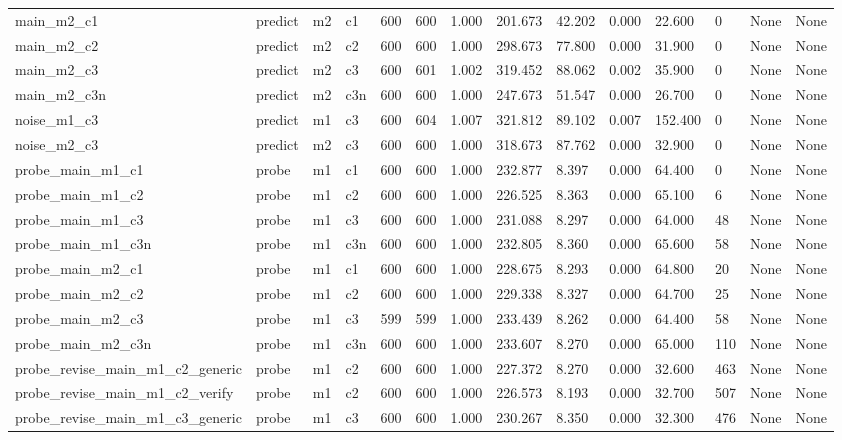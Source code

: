 \begin{tabular}{llllllllllllll}
main\_m2\_c1 & predict & m2 & c1 & 600 & 600 & 1.000 & 201.673 & 42.202 & 0.000 & 22.600 & 0 & None & None \\
main\_m2\_c2 & predict & m2 & c2 & 600 & 600 & 1.000 & 298.673 & 77.800 & 0.000 & 31.900 & 0 & None & None \\
main\_m2\_c3 & predict & m2 & c3 & 600 & 601 & 1.002 & 319.452 & 88.062 & 0.002 & 35.900 & 0 & None & None \\
main\_m2\_c3n & predict & m2 & c3n & 600 & 600 & 1.000 & 247.673 & 51.547 & 0.000 & 26.700 & 0 & None & None \\
noise\_m1\_c3 & predict & m1 & c3 & 600 & 604 & 1.007 & 321.812 & 89.102 & 0.007 & 152.400 & 0 & None & None \\
noise\_m2\_c3 & predict & m2 & c3 & 600 & 600 & 1.000 & 318.673 & 87.762 & 0.000 & 32.900 & 0 & None & None \\
probe\_main\_m1\_c1 & probe & m1 & c1 & 600 & 600 & 1.000 & 232.877 & 8.397 & 0.000 & 64.400 & 0 & None & None \\
probe\_main\_m1\_c2 & probe & m1 & c2 & 600 & 600 & 1.000 & 226.525 & 8.363 & 0.000 & 65.100 & 6 & None & None \\
probe\_main\_m1\_c3 & probe & m1 & c3 & 600 & 600 & 1.000 & 231.088 & 8.297 & 0.000 & 64.000 & 48 & None & None \\
probe\_main\_m1\_c3n & probe & m1 & c3n & 600 & 600 & 1.000 & 232.805 & 8.360 & 0.000 & 65.600 & 58 & None & None \\
probe\_main\_m2\_c1 & probe & m1 & c1 & 600 & 600 & 1.000 & 228.675 & 8.293 & 0.000 & 64.800 & 20 & None & None \\
probe\_main\_m2\_c2 & probe & m1 & c2 & 600 & 600 & 1.000 & 229.338 & 8.327 & 0.000 & 64.700 & 25 & None & None \\
probe\_main\_m2\_c3 & probe & m1 & c3 & 599 & 599 & 1.000 & 233.439 & 8.262 & 0.000 & 64.400 & 58 & None & None \\
probe\_main\_m2\_c3n & probe & m1 & c3n & 600 & 600 & 1.000 & 233.607 & 8.270 & 0.000 & 65.000 & 110 & None & None \\
probe\_revise\_main\_m1\_c2\_generic & probe & m1 & c2 & 600 & 600 & 1.000 & 227.372 & 8.270 & 0.000 & 32.600 & 463 & None & None \\
probe\_revise\_main\_m1\_c2\_verify & probe & m1 & c2 & 600 & 600 & 1.000 & 226.573 & 8.193 & 0.000 & 32.700 & 507 & None & None \\
probe\_revise\_main\_m1\_c3\_generic & probe & m1 & c3 & 600 & 600 & 1.000 & 230.267 & 8.350 & 0.000 & 32.300 & 476 & None & None \\

\end{tabular}
